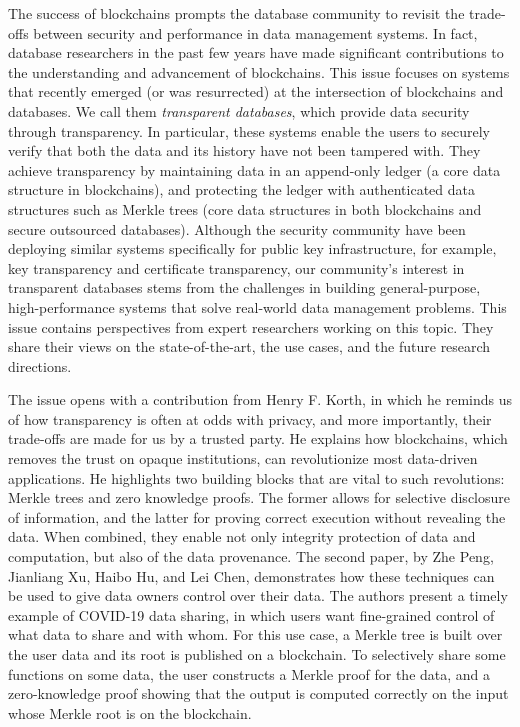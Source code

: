 \documentclass[11pt]{article}
\begin{document}
The success of blockchains prompts the database community to revisit the
trade-offs between security and performance in data management systems.  In
fact, database researchers in the past few years have made significant contributions to the
understanding and advancement of blockchains.  This issue focuses on 
systems that recently emerged (or was resurrected) at the intersection of
blockchains and databases. We call them {\em transparent databases}, which
provide data security through transparency. In particular, these systems enable
the users to securely verify that both the data and its history have not been
tampered with. They achieve transparency by maintaining data in an append-only
ledger (a core data structure in blockchains), and protecting the ledger with
authenticated data
structures such as Merkle trees (core data structures in both blockchains and secure outsourced databases).
Although the security community have been deploying similar systems specifically for public key
infrastructure, for example, key transparency and certificate transparency, our community's interest in
transparent databases stems from the challenges in building general-purpose, high-performance systems that
solve real-world data management problems. This issue contains perspectives from expert researchers working
on this topic. They share their views on the state-of-the-art, the use cases, and the future research
directions.  

The issue opens with a contribution from Henry F. Korth, in which he reminds us of how transparency is often
at odds with privacy, and more importantly, their trade-offs are made for us by a trusted party. He explains
how blockchains, which removes the trust on opaque institutions, can revolutionize most data-driven
applications. He highlights two building blocks that are vital to such revolutions: Merkle trees and zero
knowledge proofs. The former allows for selective disclosure of information, and the latter for proving
correct execution without revealing the data.  When combined, they enable not only integrity protection of
data and computation, but also of the data provenance. The second paper, by Zhe Peng, Jianliang Xu, Haibo Hu,
and Lei Chen, demonstrates how these techniques can be used to give data owners control over their data. The
authors present a timely example of COVID-19 data sharing, in which users want fine-grained control of what
data to share and with whom. For this
use case, a Merkle tree is built over the user data and its root is published on a blockchain. To selectively
share some functions on some data, the user constructs a Merkle proof for the data, and a zero-knowledge proof
showing that the output is computed correctly on the input whose Merkle root is on the blockchain. 
\end{document}
